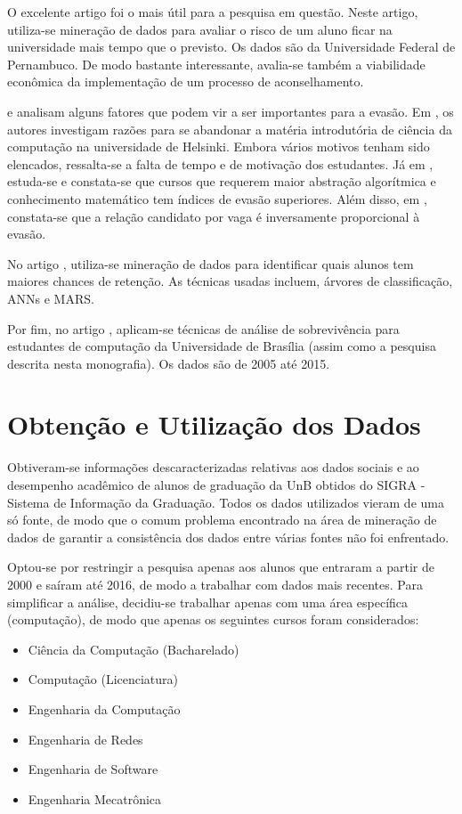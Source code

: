\par O excelente artigo \cite{adeodato} foi o mais útil para a pesquisa em questão.
Neste artigo, utiliza-se mineração de dados para avaliar o risco de um aluno ficar na
universidade mais tempo que o previsto. Os dados são da Universidade Federal de
Pernambuco. De modo bastante interessante, avalia-se também a viabilidade econômica
da implementação de um processo de aconselhamento. 
\par \cite{dropout_finland} e \cite{hoed_fatores} analisam alguns fatores que podem
vir a ser importantes para a evasão. Em \cite{dropout_finland}, os autores investigam
razões para se abandonar a matéria introdutória de ciência da computação na
universidade de Helsinki. Embora
vários motivos tenham sido elencados, ressalta-se a falta de tempo e de motivação dos
estudantes. Já em \cite{hoed_fatores}, estuda-se e constata-se que cursos que
requerem maior abstração algorítmica e conhecimento matemático tem índices de evasão
superiores. Além disso, em \cite{hoed_fatores}, constata-se que a relação candidato
por vaga é inversamente proporcional à evasão.  
\par No artigo \cite{data_mining_retention}, utiliza-se mineração de dados para
identificar quais alunos tem maiores chances de retenção. As técnicas usadas incluem,
árvores de classificação, ANNs e MARS.
\par Por fim, no artigo \cite{hoed_sobrevivencia}, aplicam-se técnicas de análise de
sobrevivência para estudantes de computação da Universidade de Brasília (assim como
a pesquisa descrita nesta monografia). Os dados são de 2005 até 2015.  

\section{Obtenção e Utilização dos Dados}
Obtiveram-se informações descaracterizadas relativas aos dados sociais e ao
desempenho acadêmico de alunos de graduação da UnB obtidos do \acrshort{SIGRA} -
Sistema de Informação da Graduação. Todos os dados utilizados vieram
de uma só fonte, de modo que o comum problema encontrado na área de mineração de
dados de garantir a consistência dos dados entre várias fontes não foi enfrentado. 
\par Optou-se por restringir a pesquisa apenas aos alunos que entraram a partir de
2000 e saíram até 2016, de modo a trabalhar com dados mais recentes. 
Para simplificar a análise, decidiu-se trabalhar apenas com uma área
específica (computação), de modo que apenas os seguintes cursos foram considerados: 
\begin{itemize}
    \item Ciência da Computação (Bacharelado)
    \item Computação (Licenciatura)
    \item Engenharia da Computação 
    \item Engenharia de Redes
    \item Engenharia de Software
    \item Engenharia Mecatrônica
\end{itemize}

